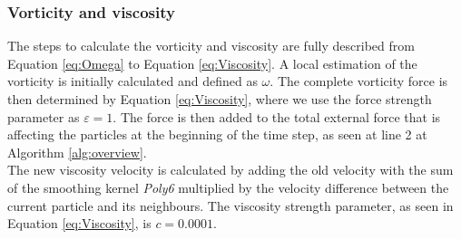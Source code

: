 \subsubsection{Vorticity and viscosity}
The steps to calculate the vorticity and viscosity are fully described from Equation \ref{eq:Omega} to Equation \ref{eq:Viscosity}.
A local estimation of the vorticity is initially calculated and defined as $\omega$. The complete vorticity force is then determined 
by Equation \ref{eq:Viscosity}, where we use the force strength parameter as $\varepsilon = 1$. The force is then added to the total 
external force that is affecting the particles at the beginning of the time step, as seen at line 2 at Algorithm \ref{alg:overview}. 
\\
The new viscosity velocity is calculated by adding the old velocity with the sum of the smoothing kernel \textit{Poly6} multiplied by the velocity difference between 
the current particle and its neighbours. The viscosity strength parameter, as seen in Equation \ref{eq:Viscosity}, is $c = 0.0001$. 